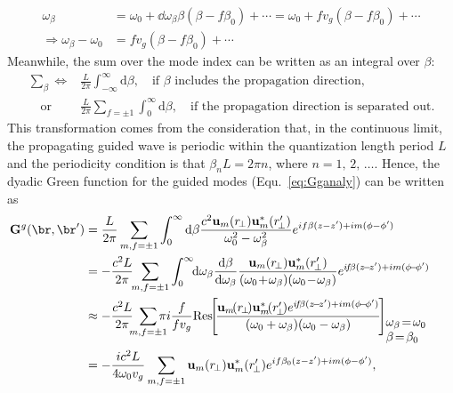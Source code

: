 \documentclass[]{report}
\begin{document}
\begin{align}
\omega_\beta &=\omega_0 + \dd{\omega_\beta}{\beta}(\beta-f\beta_0) +\cdots = \omega_0 + fv_g(\beta-f\beta_0) +\cdots\\
\Rightarrow \omega_\beta - \omega_0 &= fv_g(\beta-f\beta_0) +\cdots
\end{align}
Meanwhile, the sum over the mode index can be written as an integral over $ \beta $:
\begin{align}
\sum_{\beta} \Leftrightarrow & \frac{L}{2\pi} \int_{-\infty}^{\infty} \mathrm{d}\beta, \quad \text{if $\beta$ includes the propagation direction},\\
\quad \mathrm{or}\quad &\frac{L}{2\pi}\sum_{f=\pm 1} \int_0^{\infty} \mathrm{d}\beta,\quad\text{if the propagation direction is separated out}.
\end{align}
This  transformation comes from the consideration that, in the continuous limit, the propagating guided wave is periodic within the quantization length period $ L $ and the periodicity condition is that $ \beta_n L=2\pi n $, where $ n=1,\,2,\,\ldots $. Hence, the dyadic Green function for the guided modes (Equ.~\eqref{eq:Gganaly}) can be written as
\begin{align}
\!\!\!\!\!\!\!\!\! \mathbf{G}^g(\br,\br') &= \frac{L}{2\pi}\sum_{m,f=\pm 1}\int_0^\infty \mathrm{d}\beta \frac{c^2\mathbf{u}_{m}(r\!_\perp)\mathbf{u}^*_{m}(r_{\!\perp}^\prime)}{\omega_0^2-\omega_\beta^2}e^{if\beta(z-z')+im(\phi-\phi')}\\
&= -\frac{c^2 L}{2\pi}\!\!\sum_{m,f=\pm 1}\int_0^\infty\!\! \mathrm{d}\omega_\beta \frac{\mathrm{d}\beta}{\mathrm{d}\omega_\beta} \frac{\mathbf{u}_{m}(r\!_\perp)\mathbf{u}^*_{m}(r_{\!\perp}^\prime)}{(\omega_0\! +\!\omega_\beta) (\omega_0\!-\!\omega_\beta)} e^{i\!f\!\beta(z\!-\!z')+im(\phi\!-\!\phi')}\label{eq:eigGFintegral}\\
&\approx -\frac{c^2L}{2\pi} \!\!\! \sum_{m,f=\pm 1}\!\!\!\!\! \pi i\,\!  \frac{f}{fv_g} \mathrm{Res}\!\! \left[\! \frac{\mathbf{u}_{m}\!(r\!_\perp\! ) \mathbf{u}^*_{m}\! (r_{\!\perp}^\prime\! ) e^{i\! f\! \beta(z \!-\! z')+im(\phi\!-\! \phi')} }{(\omega_0+\omega_\beta)(\omega_0-\omega_\beta)} \!\right]\!\!\!\!_{\begin{array}{l} \omega_\beta\! =\!\omega_0 \\ \beta\! =\!\beta_0\end{array} }\\
&= -\frac{ic^2L}{4\omega_0v_g} \sum_{m,f=\pm 1} \mathbf{u}_{m}(r\!_\perp)\mathbf{u}^*_{m}(r_{\!\perp}^\prime)e^{if\beta_0(z-z')+im(\phi-\phi')},
\end{align}
\end{document}
